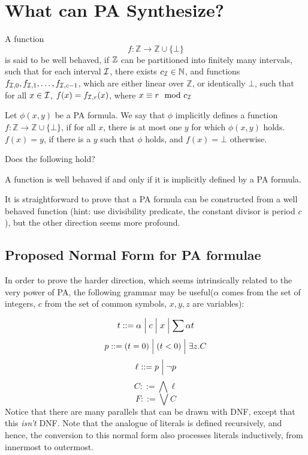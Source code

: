 \documentclass{article}
\newcommand{\bnalt}{\Bigm\vert}
\begin{document}
\section{What can PA Synthesize?}
\begin{definition}
A function $$f: \mathbb{Z} \rightarrow \mathbb{Z} \cup \{\bot\}$$ is said to be well behaved, if $\mathbb{Z}$ can be partitioned into finitely many intervals, such that for each interval $\mathcal{I}$, there exists $c_{\mathcal{I}} \in \mathbb{N}$, and functions $f_{\mathcal{I},0}, f_{\mathcal{I},1}, \dots, f_{\mathcal{I},c-1}$, which are either linear over $\mathbb{Z}$, or identically $\bot$, such that for all $x \in \mathcal{I}$, $f(x) = f_{\mathcal{I},r}(x)$, where $x \equiv r \mod c_{\mathcal{I}}$
\end{definition}

\begin{definition}
Let $\phi(x, y)$ be a PA formula. We say that $\phi$ implicitly defines a function $f: \mathbb{Z} \rightarrow \mathbb{Z} \cup \{\bot\}$, if for all $x$, there is at most one $y$ for which $\phi(x, y)$ holds. $f(x) = y$, if there is a $y$ such that $\phi$ holds, and $f(x) = \bot$ otherwise.
\end{definition}

\begin{question}
Does the following hold?

A function is well behaved if and only if it is implicitly defined by a PA formula.
\end{question}

It is straightforward to prove that a PA formula can be constructed from a well behaved function (hint: use divisibility predicate, the constant divisor is period $c$), but the other direction seems more profound.

\subsection{Proposed Normal Form for PA formulae}

In order to prove the harder direction, which seems intrinsically related to the very power of PA, the following grammar may be useful\footnotemark ($\alpha$ comes from the set of integers, $c$ from the set of common symbols, $x, y, z$ are variables):

$$
t ::= \alpha \bnalt c \bnalt x \bnalt \sum \alpha t 
$$
$$
p ::= (t = 0) \bnalt (t < 0) \bnalt \exists z. C
$$
$$
\ell ::= p \bnalt \neg p
$$
$$
C ::= \bigwedge \ell
$$
$$
F ::= \bigvee C
$$
Notice that there are many parallels that can be drawn with DNF, except that this \emph{isn't} DNF. Note that the analogue of literals is defined recursively, and hence, the conversion to this normal form also processes literals inductively, from innermost to outermost.
\end{document}
